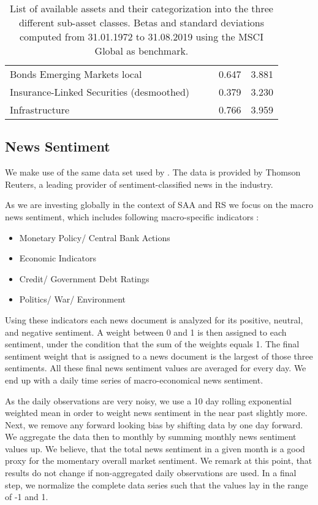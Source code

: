 \begin{table}[h!]
\begin{tabular}{@{}lcccc@{}}
Bonds Emerging Markets local                      &                   &              &  0.647    &  3.881   \\
Insurance-Linked Securities (desmoothed)          &                   &              &  0.379    &  3.230   \\
Infrastructure                                    &                   &              &  0.766    &   3.959  \\ \bottomrule
\end{tabular}
\caption{List of available assets and their categorization into the three different sub-asset classes. Betas and standard deviations computed from 31.01.1972 to 31.08.2019 using the MSCI Global as benchmark.}
\label{available_assets}
\end{table}

\subsection{News Sentiment}
We make use of the same data set used by \citet{uhl2015s}. The data is provided by Thomson Reuters, a leading provider of sentiment-classified news in the industry. 

As we are investing globally in the context of SAA and RS we focus on the macro news sentiment, which includes following macro-specific indicators \citep[p. 103]{uhl2015s}:

\begin{itemize}
    \item Monetary Policy/ Central Bank Actions
    \item Economic Indicators
    \item Credit/ Government Debt Ratings
    \item Politics/ War/ Environment
\end{itemize}

Using these indicators each news document is analyzed for its positive, neutral, and negative sentiment. A weight between 0 and 1 is then assigned to each sentiment, under the condition that the sum of the weights equals 1. The final sentiment weight that is assigned to a news document is the largest of those three sentiments. All these final news sentiment values are averaged for every day. We end up with a daily time series of macro-economical news sentiment.

As the daily observations are very noisy, we use a 10 day rolling exponential weighted mean in order to weight news sentiment in the near past slightly more. Next, we remove any forward looking bias by shifting data by one day forward. We aggregate the data then to monthly by summing monthly news sentiment values up. We believe, that the total news sentiment in a given month is a good proxy for the momentary overall market sentiment. We remark at this point, that results do not change if non-aggregated daily observations are used. In a final step, we normalize the complete data series such that the values lay in the range of -1 and 1. 

